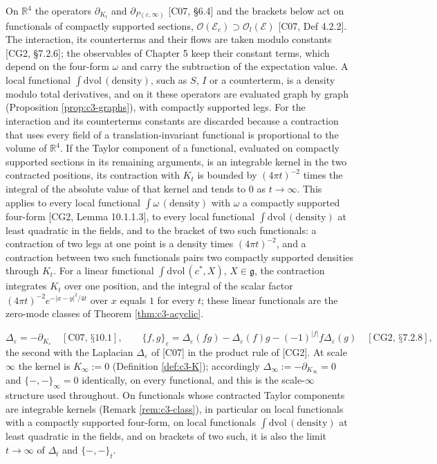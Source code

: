 \begin{remark}
\label{rem:c3-class}
On $\mathbb R^4$ the operators $\partial_{K_t}$ and $\partial_{P(\varepsilon,\infty)}$ [C07, §6.4] and the brackets below act on functionals of compactly supported sections, $\mathscr O(\mathscr E_c)\supset\mathscr O_l(\mathscr E)$ [C07, Def 4.2.2]. The interaction, its counterterms and their flows are taken modulo constants [CG2, §7.2.6]; the observables of Chapter 5 keep their constant terms, which depend on the four-form $\omega$ and carry the subtraction of the expectation value. A local functional $\int\mathrm{dvol}\,(\text{density})$, such as $S$, $I$ or a counterterm, is a density modulo total derivatives, and on it these operators are evaluated graph by graph (Proposition \ref{prop:c3-graphs}), with compactly supported legs. For the interaction and its counterterms constants are discarded because a contraction that uses every field of a translation-invariant functional is proportional to the volume of $\mathbb R^4$. If the Taylor component of a functional, evaluated on compactly supported sections in its remaining arguments, is an integrable kernel in the two contracted positions, its contraction with $K_t$ is bounded by $(4\pi t)^{-2}$ times the integral of the absolute value of that kernel and tends to $0$ as $t\to\infty$. This applies to every local functional $\int\omega\,(\text{density})$ with $\omega$ a compactly supported four-form [CG2, Lemma 10.1.1.3], to every local functional $\int\mathrm{dvol}\,(\text{density})$ at least quadratic in the fields, and to the bracket of two such functionals: a contraction of two legs at one point is a density times $(4\pi t)^{-2}$, and a contraction between two such functionals pairs two compactly supported densities through $K_t$. For a linear functional $\int\mathrm{dvol}\,(c^*,X)$, $X\in\mathfrak g$, the contraction integrates $K_t$ over one position, and the integral of the scalar factor $(4\pi t)^{-2}e^{-|x-y|^2/4t}$ over $x$ equals $1$ for every $t$; these linear functionals are the zero-mode classes of Theorem \ref{thm:c3-acyclic}.
\end{remark}

\begin{definition}
\label{def:c3-delta}
\[
\Delta_\varepsilon=-\partial_{K_\varepsilon}\quad[\text{C07, §10.1}],\qquad \{f,g\}_\varepsilon=\Delta_\varepsilon(fg)-\Delta_\varepsilon(f)g-(-1)^{|f|}f\Delta_\varepsilon(g)\quad[\text{CG2, §7.2.8}],
\]
the second with the Laplacian $\Delta_\varepsilon$ of [C07] in the product rule of [CG2]. At scale $\infty$ the kernel is $K_\infty:=0$ (Definition \ref{def:c3-K}); accordingly $\Delta_\infty:=-\partial_{K_\infty}=0$ and $\{-,-\}_\infty=0$ identically, on every functional, and this is the scale-$\infty$ structure used throughout. On functionals whose contracted Taylor components are integrable kernels (Remark \ref{rem:c3-class}), in particular on local functionals with a compactly supported four-form, on local functionals $\int\mathrm{dvol}\,(\text{density})$ at least quadratic in the fields, and on brackets of two such, it is also the limit $t\to\infty$ of $\Delta_t$ and $\{-,-\}_t$.
\end{definition}

